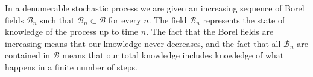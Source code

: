 In a denumerable stochastic process we are given an increasing sequence of Borel fields $\mathcal{B}_n$ such that $\mathcal{B}_n \subset \mathcal{B}$ for every $n$. The field $\mathcal{B}_n$ represents the state of knowledge of the process up to time $n$. The fact that the Borel fields are increasing means that our knowledge never decreases, and the fact that all $\mathcal{B}_n$ are contained in $\mathcal{B}$ means that our total knowledge includes knowledge of what happens in a finite number of steps.